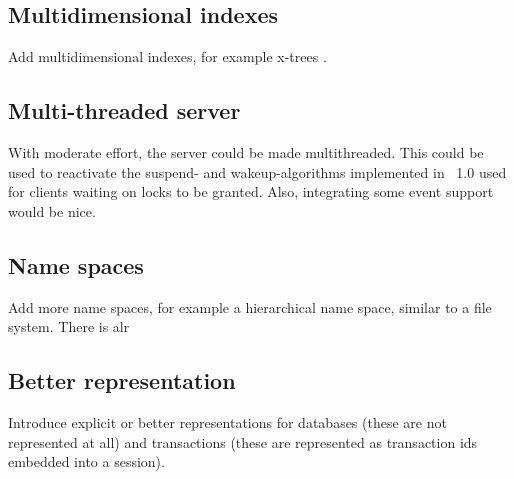 \subsection{Multidimensional indexes}

Add multidimensional indexes, for example x-trees
\cite{bib:Berchtold-et-al-96,bib:Beckmann-et-al-90}.

\subsection{Multi-threaded server}

With moderate effort, the server could be made multithreaded. This
could be used to reactivate the suspend- and wakeup-algorithms
implemented in \plob\ 1.0 used for clients waiting on locks to be
granted. Also, integrating some event support would be nice.

\subsection{Name spaces}

Add more name spaces, for example a hierarchical name space, similar
to a file system. There is alr

\subsection{Better representation}

Introduce explicit or better representations for databases (these are
not represented at all) and transactions (these are represented as
transaction ids embedded into a session).

